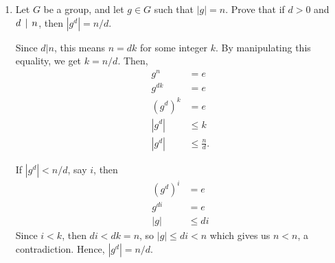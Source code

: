 \begin{enumerate}
        \item Let \(G\) be a group, and let \(g\in G\) such that \(|g| = n\). Prove that if \(d > 0\) and \(d \,\mid\, n\), then \(|g^d| = n/d\).

        Since \(d | n\), this means \(n = dk\) for some integer \(k\). By manipulating this equality, we get \(k = n/d\). Then,
        \begin{align*}
            g^n &= e \\
            g^{dk} &= e \\
            (g^d)^k &= e \\
            |g^d| &\leq k \\
            |g^d| &\leq \frac{n}{d}.
        \end{align*}

        If \(|g^d| < n/d\), say \(i\), then
        \begin{align*}
            (g^d)^i &= e \\
            g^{di} &= e \\
            |g| &\leq di
        \end{align*}
        Since \(i < k\), then \(di < dk = n\), so \(|g| \leq di < n\) which gives us \(n < n\), a contradiction. Hence, \(|g^d| = n/d\).
    \end{enumerate}